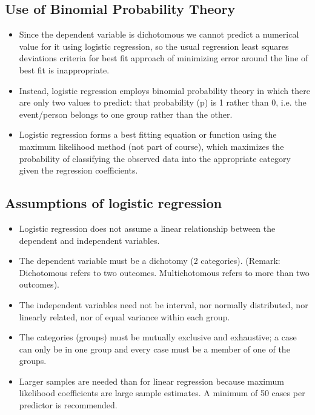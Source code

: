\documentclass[a4paper,12pt]{article}
\begin{document}
\subsection*{Use of Binomial Probability Theory}
\begin{itemize}
	\item Since the dependent variable is dichotomous we cannot predict a numerical value for it
	using logistic regression, so the usual regression least squares deviations criteria for best fit
	approach of minimizing error around the line of best fit is inappropriate.
	
	\item 	Instead, logistic regression employs binomial probability theory in which there are only two values to
	predict: that probability (p) is 1 rather than 0, i.e. the event/person belongs to one group
	rather than the other.
	\item Logistic regression forms a best fitting equation or function using the
	maximum likelihood method (not part of course), which maximizes the probability of classifying the observed
	data into the appropriate category given the regression coefficients.
\end{itemize}



\subsection{Assumptions of logistic regression}
\begin{itemize}
\item Logistic regression does not assume a linear relationship between the dependent and
independent variables.
\item The dependent variable must be a dichotomy (2 categories).
(Remark: Dichotomous refers to two outcomes. Multichotomous refers to more than two outcomes).
\item The independent variables need not be interval, nor normally distributed, nor linearly
related, nor of equal variance within each group.
\item The categories (groups) must be mutually exclusive and exhaustive; a case can only be
in one group and every case must be a member of one of the groups.
\item Larger samples are needed than for linear regression because maximum likelihood
coefficients are large sample estimates. A minimum of 50 cases per predictor is
recommended.
\end{itemize}
\newpage
\end{document}
